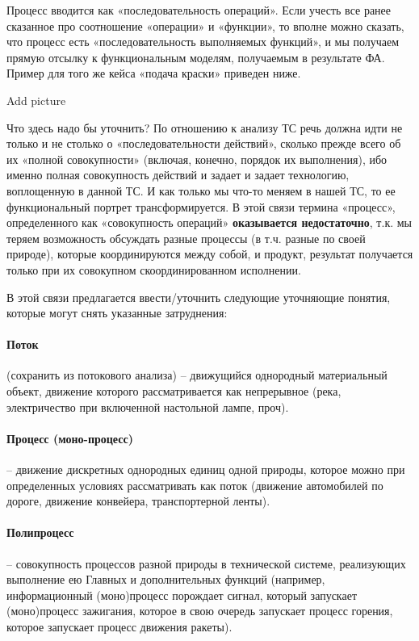 \documentclass[11pt,a4paper]{article}
\begin{document}
Процесс вводится как «последовательность операций». Если учесть все ранее сказанное
про соотношение «операции» и «функции», то вполне можно сказать, что процесс есть
«последовательность выполняемых функций», и мы получаем прямую отсылку к
функциональным моделям, получаемым в результате ФА. Пример для того же кейса
«подача краски» приведен ниже.
\begin{center}
  Add picture
\end{center}
Что здесь надо бы уточнить? По отношению к анализу ТС речь должна идти не
только и не столько о «последовательности действий», сколько прежде всего об
их «полной совокупности» (включая, конечно, порядок их выполнения), ибо именно
полная совокупность действий и задает и задает технологию, воплощенную в
данной ТС. И как только мы что-то меняем в нашей ТС, то ее функциональный
портрет трансформируется.  В этой связи термина «процесс», определенного как
«совокупность операций» \textbf{оказывается недостаточно}, т.к. мы теряем
возможность обсуждать разные процессы (в т.ч. разные по своей природе),
которые координируются между собой, и продукт, результат получается только при
их совокупном скоординированном исполнении.

В этой связи предлагается ввести/уточнить следующие уточняющие понятия,
которые могут снять указанные затруднения:

\paragraph{Поток}
(сохранить из потокового анализа) – движущийся однородный материальный объект,
движение которого рассматривается как непрерывное (река, электричество при
включенной настольной лампе, проч).

\paragraph{Процесс (моно-процесс)}
– движение дискретных однородных единиц одной природы, которое можно при
определенных условиях рассматривать как поток (движение автомобилей по дороге,
движение конвейера, транспортерной ленты).

\paragraph{Полипроцесс}
– совокупность процессов разной природы в технической системе, реализующих
выполнение ею Главных и дополнительных функций (например, информационный
(моно)процесс порождает сигнал, который запускает (моно)процесс зажигания,
которое в свою очередь запускает процесс горения, которое запускает процесс
движения ракеты).
\end{document}
